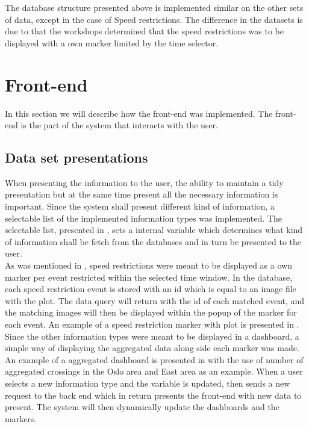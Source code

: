The database structure presented above is implemented similar on the other 
sets of data, except in the case of Speed restrictions. The difference in the
datasets is due to that the workshops determined that the speed restrictions
was to be displayed with a own marker limited by the time selector.


\section{Front-end} %
\label{sec:front_end}
In this section we will describe how the front-end was implemented. The
front-end is the part of the system that interacts with the user.

\subsection{Data set presentations} %
\label{sub:front_end_data_set_presentation}
When presenting the information to the user, the ability to maintain a tidy
presentation but at the same time present all the necessary information is 
important. Since the system shall present different kind of information, a 
selectable list of the implemented information types was implemented. The 
selectable list, presented in , sets a 
internal variable which determines what kind of information shall be fetch 
from the databases and in turn be presented to the user.\\

As was mentioned in , speed restrictions were
meant to be displayed as a own marker per event restricted within the selected
time window. In the database, each speed restriction event is stored with an id
which is equal to an image file with the plot. The data query will return with 
the id of each matched event, and the matching images will then be displayed
within the popup of the marker for each event. An example of a speed 
restriction marker with plot is presented in .\\


Since the other information types were meant to be displayed in a dashboard, a
simple way of displaying the aggregated data along side each marker was made.
An example of a aggregated dashboard is presented in  with the use of number of aggregated crossings in the Oslo area and East area as an example. When a user selects a new information type and the variable is updated, then sends a new request to the back end which in return presents the front-end with new data to present. The system will then dynamically update the dashboards and the markers.


